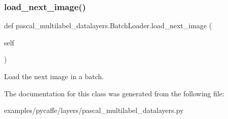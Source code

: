 \subsubsection{\texorpdfstring{load\+\_\+next\+\_\+image()}{load\_next\_image()}}
{\footnotesize\ttfamily def pascal\+\_\+multilabel\+\_\+datalayers.\+Batch\+Loader.\+load\+\_\+next\+\_\+image (\begin{DoxyParamCaption}\item[{}]{self }\end{DoxyParamCaption})}

\begin{DoxyVerb}Load the next image in a batch.
\end{DoxyVerb}
 

The documentation for this class was generated from the following file\+:\begin{DoxyCompactItemize}
\item 
examples/pycaffe/layers/pascal\+\_\+multilabel\+\_\+datalayers.\+py\end{DoxyCompactItemize}
